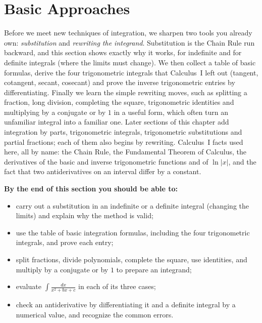 \documentclass[11pt]{article}
\begin{document}
\section{Basic Approaches}

\begin{guide}
Before we meet new techniques of integration, we sharpen two tools you already own: \emph{substitution} and \emph{rewriting the integrand}. Substitution is the Chain Rule run backward, and this section shows exactly why it works, for indefinite and for definite integrals (where the limits must change). We then collect a table of basic formulas, derive the four trigonometric integrals that Calculus~I left out (tangent, cotangent, secant, cosecant) and prove the inverse trigonometric entries by differentiating. Finally we learn the simple rewriting moves, such as splitting a fraction, long division, completing the square, trigonometric identities and multiplying by a conjugate or by $1$ in a useful form, which often turn an unfamiliar integral into a familiar one. Later sections of this chapter add integration by parts, trigonometric integrals, trigonometric substitutions and partial fractions; each of them also begins by rewriting. Calculus~I facts used here, all by name: the Chain Rule, the Fundamental Theorem of Calculus, the derivatives of the basic and inverse trigonometric functions and of $\ln\lvert x\rvert$, and the fact that two antiderivatives on an interval differ by a constant.
\end{guide}

\textbf{By the end of this section you should be able to:}
\begin{itemize}
  \item carry out a substitution in an indefinite or a definite integral (changing the limits) and explain why the method is valid;
  \item use the table of basic integration formulas, including the four trigonometric integrals, and prove each entry;
  \item split fractions, divide polynomials, complete the square, use identities, and multiply by a conjugate or by $1$ to prepare an integrand;
  \item evaluate $\int\frac{dx}{x^2+bx+c}$ in each of its three cases;
  \item check an antiderivative by differentiating it and a definite integral by a numerical value, and recognize the common errors.
\end{itemize}

\end{document}
